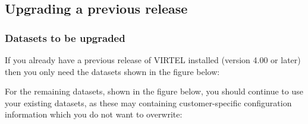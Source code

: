 \documentclass[letterpaper,10pt,english]{sphinxmanual}
\begin{document}
\begin{sphinxVerbatim}[commandchars=\\\{\}]
     

     
\end{sphinxVerbatim}


\subsection{Upgrading a previous release}
\label{\detokenize{Installation_Guide:upgrading-a-previous-release}}

\subsubsection{Datasets to be upgraded}
\label{\detokenize{Installation_Guide:datasets-to-be-upgraded}}
If you already have a previous release of VIRTEL installed (version 4.00 or later) then you only need the datasets shown in the figure below:

\begin{sphinxVerbatim}[commandchars=\\\{\}]
\end{sphinxVerbatim}


For the remaining datasets, shown in the figure below, you should continue to use your existing datasets, as these may containing customer-specific configuration information which you do not want to overwrite:
\end{document}

